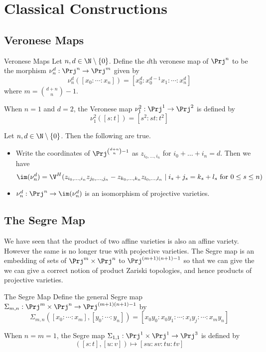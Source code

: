 \documentclass[a4paper]{article}
\begin{document}
\pagebreak
\section{Classical Constructions}
\subsection{Veronese Maps}
\begin{defn}{Veronese Maps}{} Let $n,d\in\N\setminus\{0\}$. Define the $d$th veronese map of $\Prj^n$ to be the morphism $\nu_n^d:\Prj^n\to\Prj^m$ given by $$\nu_n^d([x_0:\cdots:x_n])=[x_0^d:x_0^{d-1}x_1:\cdots:x_n^d]$$ where $m=\binom{d+n}{n}-1$. 
\end{defn}

When $n=1$ and $d=2$, the Veronese map $\nu_1^2:\Prj^1\to\Prj^2$ is defined by $$\nu_1^2([s:t])=[s^2:st:t^2]$$

\begin{prp}{}{} Let $n,d\in\N\setminus\{0\}$. Then the following are true. 
\begin{itemize}
\item Write the coordinates of $\Prj^{\binom{d+n}{n}-1}$ as $z_{i_0,\dots,i_n}$ for $i_0+\dots+i_n=d$. Then we have $$\im(\nu_n^d)=\V^H(z_{i_0,\dots,i_n}z_{j_0,\dots,j_n}-z_{k_0,\dots,k_n}z_{l_0,\dots,l_n}\;|\;i_s+j_s=k_s+l_s\text{ for }0\leq s\leq n)$$
\item $\nu_n^d:\Prj^n\to\im(\nu_n^d)$ is an isomorphism of projective varieties. 
\end{itemize}
\end{prp}

\subsection{The Segre Map}
We have seen that the product of two affine varieties is also an affine variety. However the same is no longer true with projective varieties. The Segre map is an embedding of sets of $\Prj^m\times\Prj^n$ to $\Prj^{(m+1)(n+1)-1}$ so that we can give the we can give a correct notion of product Zariski topologies, and hence products of projective varieties. 

\begin{defn}{The Segre Map}{} Define the general Segre map $\Sigma_{m,n}:\Prj^m\times\Prj^n\to\Prj^{(m+1)(n+1)-1}$ by $$\Sigma_{m,n}([x_0:\cdots:x_m],[y_0:\cdots:y_n])=[x_0y_0:x_0y_1:\cdots:x_iy_j:\cdots:x_my_n]$$
\end{defn}

When $n=m=1$, the Segre map $\Sigma_{1,1}:\Prj^1\times\Prj^1\to\Prj^3$ is defined by $$([s:t],[u:v])\mapsto[su:sv:tu:tv]$$
\end{document}
